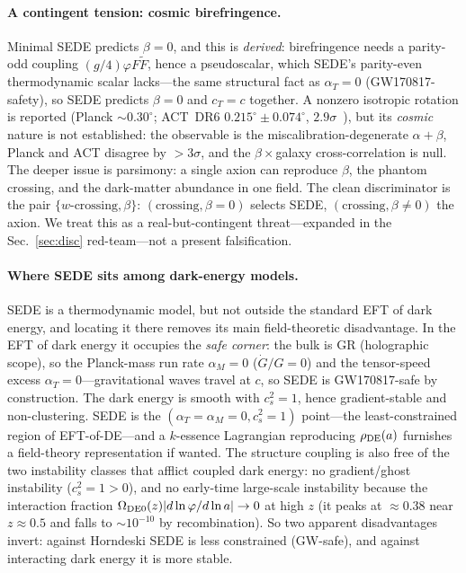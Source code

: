 \paragraph{A contingent tension: cosmic birefringence.} Minimal SEDE predicts $\beta=0$, and this is
\emph{derived}: birefringence needs a parity-odd coupling $(g/4)\varphi F\tilde F$, hence a
pseudoscalar, which SEDE's parity-even thermodynamic scalar lacks---the same structural fact as
$\alpha_T=0$ (GW170817-safety), so SEDE predicts $\beta=0$ and $c_T=c$ together. A nonzero isotropic
rotation is reported (Planck $\sim0.30^\circ$; ACT~DR6 $0.215^\circ\pm0.074^\circ$,
$2.9\sigma$~\cite{Eskilt:2022cff}), but its \emph{cosmic} nature is not established: the observable is
the miscalibration-degenerate $\alpha+\beta$, Planck and ACT disagree by ${>}3\sigma$, and the
$\beta\times$galaxy cross-correlation is null. The deeper issue is parsimony: a single axion can
reproduce $\beta$, the phantom crossing, and the dark-matter abundance in one field. The clean
discriminator is the pair $\{w\text{-crossing},\beta\}$: $(\text{crossing},\beta=0)$ selects SEDE,
$(\text{crossing},\beta\neq0)$ the axion. We treat this as a real-but-contingent threat---expanded in
the Sec.~\ref{sec:disc} red-team---not a present falsification.

\paragraph{Where SEDE sits among dark-energy models.} SEDE is a thermodynamic model, but not outside the
standard EFT of dark energy, and locating it there removes its main field-theoretic disadvantage. In the
EFT of dark energy it occupies the \emph{safe corner}: the bulk is GR (holographic scope), so the
Planck-mass run rate $\alpha_M=0$ ($\dot G/G=0$) and the tensor-speed excess $\alpha_T=0$---gravitational
waves travel at $c$, so SEDE is GW170817-safe by construction. The dark energy is smooth with $c_s^2=1$,
hence gradient-stable and non-clustering. SEDE is the $(\alpha_T=\alpha_M=0,c_s^2=1)$ point---the
least-constrained region of EFT-of-DE---and a $k$-essence Lagrangian reproducing $\rho_{\mathrm{DE}}(a)$ furnishes a
field-theory representation if wanted. The structure coupling is also free of the two instability classes
that afflict coupled dark energy: no gradient/ghost instability ($c_s^2=1>0$), and no early-time
large-scale instability because the interaction fraction $\Omega_{\mathrm{DE0}}(z)|d\ln\varphi/d\ln a|\to0$ at high $z$
(it peaks at $\approx0.38$ near $z\approx0.5$ and falls to $\sim10^{-10}$ by recombination). So two
apparent disadvantages invert: against Horndeski SEDE is less constrained (GW-safe), and against
interacting dark energy it is more stable.

